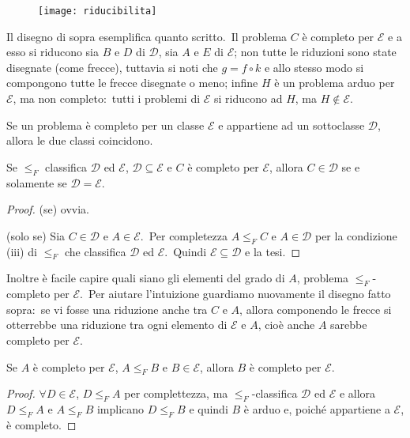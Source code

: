 \begin{figure}[H]
    \centering
    \texttt{[image: riducibilita]}
\end{figure}

\noindent Il disegno di sopra esemplifica quanto scritto.\
Il problema $C$ è completo per $\mathcal{E}$ e a esso si riducono sia $B$ e $D$ di $\mathcal{D}$, sia $A$ e $E$ di $\mathcal{E}$; non tutte le riduzioni sono state disegnate (come frecce), tuttavia si noti che $g = f \circ k$ e allo stesso modo si compongono tutte le frecce disegnate o meno; infine $H$ è un problema arduo per $\mathcal{E}$, ma non completo:\ tutti i problemi di $\mathcal{E}$ si riducono ad $H$, ma $H \notin \mathcal{E}$.

Se un problema è completo per un classe $\mathcal{E}$ e appartiene ad un sottoclasse $\mathcal{D}$, allora le due classi coincidono.\

\begin{property}
    Se $\leqslant_F$ classifica $\mathcal{D}$ ed $\mathcal{E}$, $\mathcal{D} \subseteq \mathcal{E}$ e $C$ è completo per $\mathcal{E}$, allora $C \in \mathcal{D}$ se e solamente se $\mathcal{D} = \mathcal{E}$.\
\end{property}

\begin{proof}
    (se) ovvia.\

    \noindent(solo se) Sia $C \in \mathcal{D}$ e $A \in \mathcal{E}$.\
    Per completezza $A \leqslant_F C$ e $A \in \mathcal{D}$ per la condizione (iii) di $\leqslant_F$ che classifica $\mathcal{D}$ ed $\mathcal{E}$.\
    Quindi $\mathcal{E} \subseteq \mathcal{D}$ e la tesi.
\end{proof}

\noindent Inoltre è facile capire quali siano gli elementi del grado di $A$, problema $\leqslant_F$-completo per $\mathcal{E}$.\
Per aiutare l'intuizione guardiamo nuovamente il disegno fatto sopra:\ se vi fosse una riduzione anche tra $C$ e $A$, allora componendo le frecce si otterrebbe una riduzione tra ogni elemento di $\mathcal{E}$ e $A$, cioè anche $A$ sarebbe completo per $\mathcal{E}$.

\begin{property}
    Se $A$ è completo per $\mathcal{E}$, $A \leqslant_F B$ e $B \in \mathcal{E}$, allora $B$ è completo per $\mathcal{E}$.
\end{property}

\begin{proof}
    $\forall D \in \mathcal{E}$, $D \leqslant_F A$ per complettezza, ma $\leqslant_F$-classifica $\mathcal{D}$ ed $\mathcal{E}$ e allora $D \leqslant_F A$ e $A \leqslant_F B$ implicano $D \leqslant_F B$ e quindi $B$ è arduo e, poiché appartiene a $\mathcal{E}$, è completo.
\end{proof}

